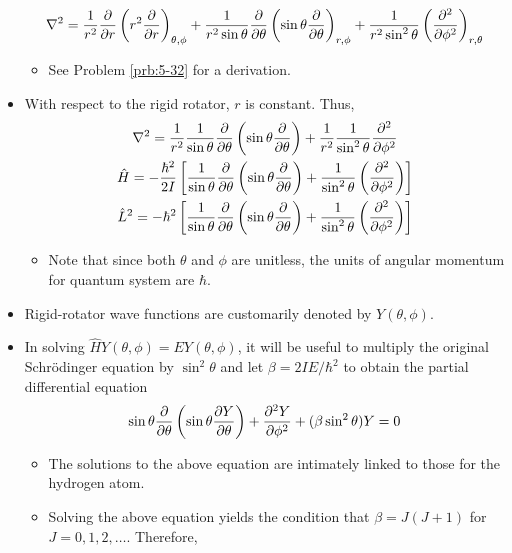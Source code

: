 \documentclass[../notes.tex]{subfiles}
\begin{document}
\begin{itemize}
    \begin{equation*}
        \nabla^2 = \frac{1}{r^2}\pdv{r}\left( r^2\pdv{r} \right)_{\theta,\phi}+\frac{1}{r^2\sin\theta}\pdv{\theta}\left( \sin\theta\pdv{\theta} \right)_{r,\phi}+\frac{1}{r^2\sin^2\theta}\left( \pdv[2]{\phi} \right)_{r,\theta}
    \end{equation*}
    \begin{itemize}
        \item See Problem \ref{prb:5-32} for a derivation.
    \end{itemize}
    \item With respect to the rigid rotator, $r$ is constant. Thus,
    \begin{gather*}
        \nabla^2 = \frac{1}{r^2}\frac{1}{\sin\theta}\pdv{\theta}\left( \sin\theta\pdv{\theta} \right)+\frac{1}{r^2}\frac{1}{\sin^2\theta}\pdv[2]{\phi}\\
        \hat{H} = -\frac{\hbar^2}{2I}\left[ \frac{1}{\sin\theta}\pdv{\theta}\left( \sin\theta\pdv{\theta} \right)+\frac{1}{\sin^2\theta}\left( \pdv[2]{\phi} \right) \right]\\
        \hat{L}^2 = -\hbar^2\left[ \frac{1}{\sin\theta}\pdv{\theta}\left( \sin\theta\pdv{\theta} \right)+\frac{1}{\sin^2\theta}\left( \pdv[2]{\phi} \right) \right]
    \end{gather*}
    \begin{itemize}
        \item Note that since both $\theta$ and $\phi$ are unitless, the units of angular momentum for quantum system are $\hbar$.
    \end{itemize}
    \item Rigid-rotator wave functions are customarily denoted by $Y(\theta,\phi)$.
    \item In solving $\hat{H}Y(\theta,\phi)=EY(\theta,\phi)$, it will be useful to multiply the original Schr\"{o}dinger equation by $\sin^2\theta$ and let $\beta=2IE/\hbar^2$ to obtain the partial differential equation
    \begin{equation*}
        \sin\theta\pdv{\theta}\left( \sin\theta\pdv{Y}{\theta} \right)+\pdv[2]{Y}{\phi}+(\beta\sin^2\theta)Y = 0
    \end{equation*}
    \begin{itemize}
        \item The solutions to the above equation are intimately linked to those for the hydrogen atom.
        \item Solving the above equation yields the condition that $\beta=J(J+1)$ for $J=0,1,2,\dots$. Therefore,

\end{itemize}
\end{itemize}
\end{document}
